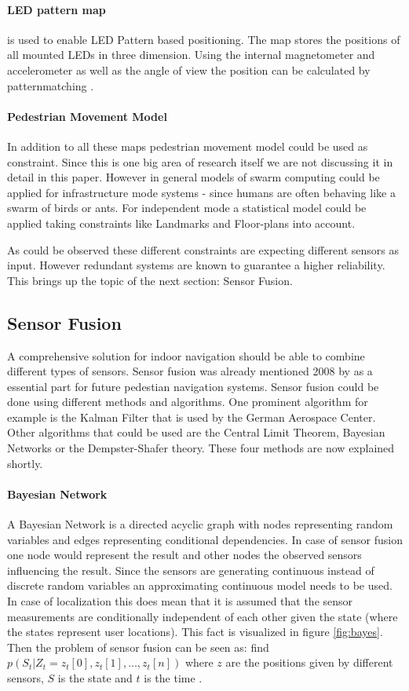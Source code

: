 \paragraph{LED pattern map} is used to enable LED Pattern based positioning. The map stores the positions of all mounted LEDs in three dimension. Using the internal magnetometer and accelerometer as well as the angle of view the position can be calculated by patternmatching \parencite{bytelight}. 

\paragraph{Pedestrian Movement Model} In addition to all these maps pedestrian movement model could be used as constraint. Since this is one big area of research itself we are not discussing it in detail in this paper. However in general models of swarm computing could be applied for infrastructure mode systems - since humans are often behaving like a swarm of birds or ants. For independent mode a statistical model could be applied taking constraints like Landmarks and Floor-plans into account.  

As could be observed these different constraints are expecting different sensors as input. However redundant systems are known to guarantee a higher reliability. This brings up the topic of the next section: Sensor Fusion.

\pagebreak
\subsection{Sensor Fusion}
A comprehensive solution for indoor navigation should be able to combine different types of sensors. Sensor fusion was already mentioned 2008 by \textcite{dlrFiebig} as a essential part for future pedestian navigation systems.  
Sensor fusion could be done using different methods and algorithms. One prominent algorithm for example is the Kalman Filter that is used by the German Aerospace Center. Other algorithms that could be used are the Central Limit Theorem, Bayesian Networks or the Dempster-Shafer theory. These four methods are now explained shortly.

\paragraph{Bayesian Network} A Bayesian Network is a directed acyclic graph with nodes representing random variables and edges representing conditional dependencies. In case of sensor fusion one node would represent the result and other nodes the observed sensors influencing the result. Since the sensors are generating continuous instead of discrete random variables an approximating continuous model needs to be used.
In case of localization this does mean that it is assumed that the sensor measurements are conditionally independent of each other given the state (where the states represent user locations). This fact is visualized in figure \ref{fig:bayes}.
Then the problem of sensor fusion can be seen as: find $p(S_{t}| Z_{t}={z_{t}[0],z_{t}[1],...,z_{t}[n]})$ where $z$ are the positions given by different sensors, $S$ is the state and $t$ is the time \parencite{mapCraft}.

